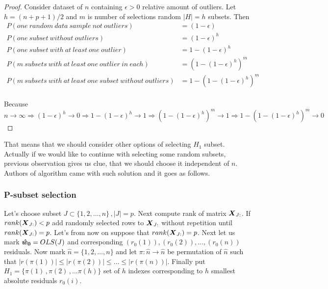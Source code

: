 \begin{proof}
	Consider dataset of $n$ containing $\epsilon > 0$ relative amount of outliers. Let $h=(n+p+1)/2$ and $m$ is number of selections random $|H| = h$ subsets. Then
	\begin{align*}
		P(one~random~data~sample~not~outliers) &= (1-\epsilon) \\
		P(one~subset~without~outliers) &= (1-\epsilon)^h \\
		P(one~subset~with~at~least~one~outlier) &= 1-(1-\epsilon)^h \\
		P(m~subsets~with~at~least~one~outlier~in~each) &= (1-(1-\epsilon)^h)^m \\
		P(m~subsets~with~at~least~one~subset~without~outliers) &= 1-(1-(1-\epsilon)^h)^m \\
	\end{align*}

	Because $n \rightarrow \infty 	
	\Rightarrow (1-\epsilon)^h  \rightarrow 0 	
	\Rightarrow 1- (1-\epsilon)^h  \rightarrow 1
	\Rightarrow (1-(1-\epsilon)^h)^m  \rightarrow 1
	\Rightarrow 1- (1-(1-\epsilon)^h)^m  \rightarrow 0 $
\end{proof}

That means that we should consider other options of selecting $H_1$ subset. Actually if we would like to continue with selecting some random subsets, previous observation gives us clue, that we should choose it independent of $n$. Authors of algorithm came with such solution and it goes as follows.

\subsubsection{P-subset selection}
Let's choose subset $J \subset \{{1,2,\ldots,n\}}\,, |J| = p$. Next compute rank of matrix $\m{X}_{J:}$. If $rank(\m{X}_{J:}) < p$ add randomly selected rows to $\m{X}_{J:}$ without repetition until $rank(\m{X}_{J:}) = p$. Let's from now on suppose that $rank(\m{X}_{J:}) = p$. Next let us mark $\boldsymbol{\hat{w}_0} = OLS(J)$ and corresponding $(r_0(1)), (r_0(2)), \ldots ,(r_0(n))$ residuals.  Now mark $\hat{n} = \{{1,2,\ldots,n\}}$ and let
$\pi: \hat{n} \rightarrow \hat{n}$ be permutation of $\hat{n}$ such that $|r({\pi(1)})| \leq |r({\pi(2)})| \leq \ldots \leq |r({\pi(n)})|$. Finally put $H_1 = \{{\pi(1)\,, \pi(2)\,,... \pi(h)\}}$ set of $h$ indexes corresponding to $h$ smallest absolute residuals $r_0(i)$.

